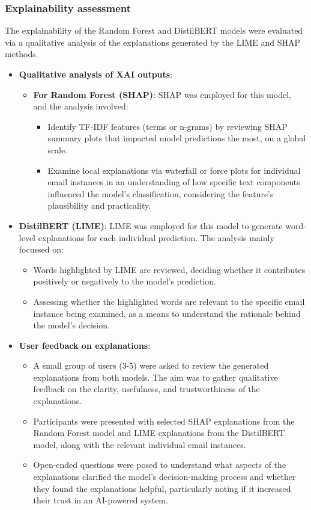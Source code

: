 
\subsubsection*{Explainability assessment}
The explainability of the Random Forest and DistilBERT models were evaluated via a qualitative analysis of the explanations generated by the LIME and SHAP methods.

\begin{itemize}
  \item \textbf{Qualitative analysis of XAI outputs}:
  \begin{itemize}
    \item \textbf{For Random Forest (SHAP)}: SHAP was employed for this model, and the analysis involved:
    \begin{itemize}
      \item Identify TF-IDF features (terms or n-grams) by reviewing SHAP summary plots that impacted model predictions the most, on a global scale.
      \item Examine local explanations via waterfall or force plots for individual email instances in an understanding of how specific text components influenced the model's classification, considering the feature's plausibility and practicality.
    \end{itemize}
  \end{itemize}
  \item \textbf{DistilBERT (LIME)}: LIME was employed for this model to generate word-level explanations for each individual prediction. The analysis mainly focussed on:
  \begin{itemize}
    \item Words highlighted by LIME are reviewed, deciding whether it contributes positively or negatively to the model's prediction.
    \item Assessing whether the highlighted words are relevant to the specific email instance being examined, as a means to understand the rationale behind the model's decision.
  \end{itemize}
  \item \textbf{User feedback on explanations}:
  \begin{itemize}
    \item A small group of users (3-5) were asked to review the generated explanations from both models. The aim was to gather qualitative feedback on the clarity, usefulness, and trustworthiness of the explanations.
    \item Participants were presented with selected SHAP explanations from the Random Forest model and LIME explanations from the DistilBERT model, along with the relevant individual email instances.
    \item Open-ended questions were posed to understand what aspects of the explanations clarified the model's decision-making process and whether they found the explanations helpful, particularly noting if it increased their trust in an AI-powered system.
  \end{itemize}
\end{itemize}
